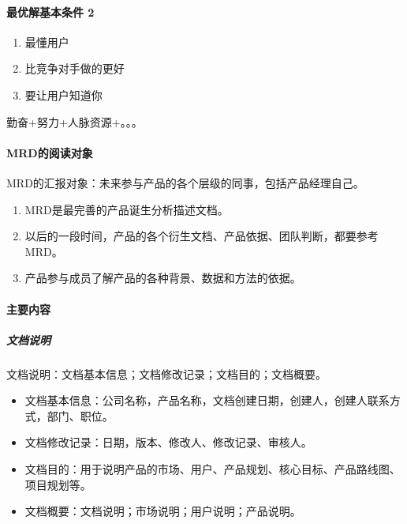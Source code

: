 \documentclass[letterpaper,10pt,english]{sphinxmanual}
\begin{document}
\paragraph{最优解基本条件 2\sphinxfootnotemark[559]}
\label{\detokenize{chapter_knowledge/MRD:id2}}%
\begin{footnotetext}[559]\sphinxAtStartFootnote
{}
%
\end{footnotetext}\ignorespaces \begin{enumerate}
%
\item {} 
最懂用户

\item {} 
比竞争对手做的更好

\item {} 
要让用户知道你

\end{enumerate}

勤奋+努力+人脉资源+。。。


\paragraph{MRD的阅读对象}
\label{\detokenize{chapter_knowledge/MRD:mrd}}
MRD的汇报对象：未来参与产品的各个层级的同事，包括产品经理自己。
\begin{enumerate}
%
\item {} 
MRD是最完善的产品诞生分析描述文档。

\item {} 
以后的一段时间，产品的各个衍生文档、产品依据、团队判断，都要参考MRD。

\item {} 
产品参与成员了解产品的各种背景、数据和方法的依据。

\end{enumerate}


\paragraph{主要内容}
\label{\detokenize{chapter_knowledge/MRD:id3}}

\subparagraph{文档说明}
\label{\detokenize{chapter_knowledge/MRD:id4}}
文档说明：文档基本信息；文档修改记录；文档目的；文档概要。
\begin{itemize}
\item {} 
文档基本信息：公司名称，产品名称，文档创建日期，创建人，创建人联系方式，部门、职位。

\item {} 
文档修改记录：日期，版本、修改人、修改记录、审核人。

\item {} 
文档目的：用于说明产品的市场、用户、产品规划、核心目标、产品路线图、项目规划等。

\item {} 
文档概要：文档说明；市场说明；用户说明；产品说明。

\end{itemize}
\end{document}

